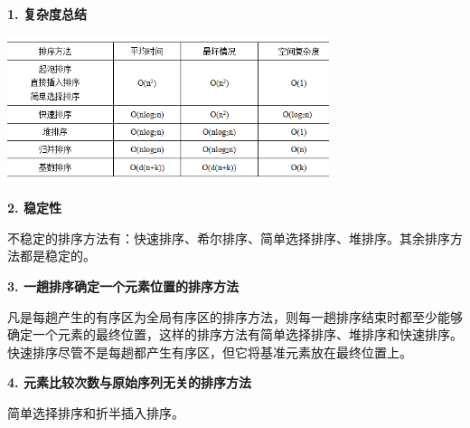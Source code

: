 {\textbf{1. 复杂度总结}}{}

\includegraphics[width=3.70833in,height=1.68750in]{png-jpeg-pics/0DF3E739B360E9D3730BB2F37C5685AC.png}

{\textbf{2. 稳定性}}

{不稳定的排序方法有：快速排序、希尔排序、简单选择排序、堆排序。}{其余排序方法都是稳定的。}

{\textbf{3. 一趟排序确定一个元素位置的排序方法}}

{凡是每趟产生的有序区为全局有序区的排序方法，则每一趟排序结束时都至少能够确定一个元素的最终位置，这样的排序方法有简单选择排序、堆排序和快速排序。快速排序尽管不是每趟都产生有序区，但它将基准元素放在最终位置上。}

{\textbf{4. 元素比较次数与原始序列无关的排序方法}}

{简单选择排序和折半插入排序。}
